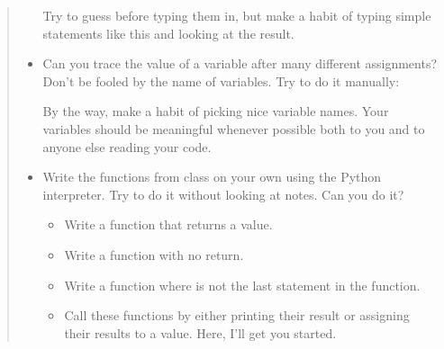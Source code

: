 \documentclass[letterpaper,10pt,english]{sphinxmanual}
\begin{document}
\begin{quote}
\begin{itemize}
Try to guess before typing them in, but make a habit of typing simple
statements like this and looking at the result.

\item {} 
 Can you trace the value of a variable after many
different assignments? Don’t be fooled by the name of variables.
Try to do it manually:

%
\begin{sphinxVerbatim}[commandchars=\\\{\}]
  
  
  
    
      
\end{sphinxVerbatim}

By the way, make a habit of picking nice variable names.  Your
variables should be meaningful whenever possible both to you and to
anyone else reading your code.

\item {} 
 Write the functions from class on your own using
the Python interpreter. Try to do it without looking at
notes. Can you do it?
\begin{itemize}
\item {} 
Write a function that returns a value.

\item {} 
Write a function with no return.

\item {} 
Write a function where  is not the last statement in the
function.

\item {} 
Call these functions by either printing their result or assigning
their results to a value. Here, I’ll get you started.

\end{itemize}

%
\begin{sphinxVerbatim}[commandchars=\\\{\}]
 
     


\end{sphinxVerbatim}
\end{itemize}
\end{quote}
\end{document}
